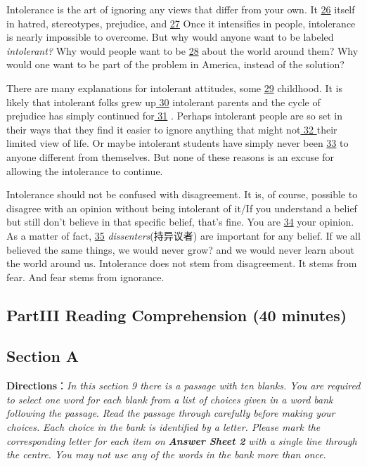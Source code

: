 \documentclass[UTF8,11pt]{ctexart}
\begin{document}
Intolerance is the art of ignoring any views that differ from your own. It \uline{26} itself in hatred, stereotypes, prejudice, and \uline{27} Once it intensifies in people, intolerance is nearly impossible to overcome. But why would anyone want to be labeled\textit{ intolerant?} Why would people want to be \uline{28} about the world around them? Why would one want to be part of the problem in America, instead of the solution?


There are many explanations for intolerant attitudes, some \uline{29} childhood. It is likely that intolerant folks grew up\uline{ 30} intolerant parents and the cycle of prejudice has simply continued for\uline{ 31} . Perhaps intolerant people are so set in their ways that they find it easier to ignore anything that might not\uline{ 32 }their limited view of life. Or maybe intolerant students have simply never been \uline{33} to anyone different from themselves. But none of these reasons is an excuse for allowing the intolerance to continue.


Intolerance should not be confused with disagreement. It is, of course, possible to disagree with an opinion without being intolerant of it/If you understand a belief but still don’t believe in that specific belief, that’s fine. You are \uline{34} your opinion. As a matter of fact, \uline{35} \textit{dissenters}(持异议者) are important for any belief. If we all believed the same things, we would never grow? and we would never learn about the world around us. Intolerance does not stem from disagreement. It stems from fear. And fear stems from ignorance.


\subsection*{\textbf{Part}III \textbf{Reading Comprehension} \textbf{(40 minutes)}}


\subsection*{\textbf{Section A}}


\textbf{Directions}：\textit{In this section 9 there is a passage with ten blanks. You are required to select one word for each blank from a} \textit{list of choices given in a word bank following the passage}.\textit{ Read the passage through carefully before making your choices.} \textit{Each choice in the bank is identified by a letter. Please mark the corresponding letter for each item on}\textbf{\textit{ Answer Sheet 2}} \textit{with a single line through the centre. You may not use any of the words in the bank more than once}.
\end{document}
